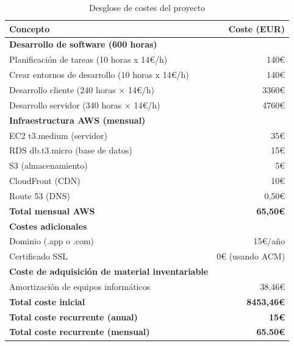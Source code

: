 \begin{table}[H]
	\centering
	\begin{tabular}{lr}
		\toprule
		\textbf{Concepto} & \textbf{Coste (EUR)} \\
		\midrule
		\textbf{Desarrollo de software (600 horas)} & \\
		\quad Planificación de tareas (10 horas x 14€/h) & 140€ \\
		\quad Crear entornos de desarrollo  (10 horas x 14€/h) & 140€ \\
		\quad Desarrollo cliente (240 horas × 14€/h) & 3360€ \\
		\quad Desarrollo servidor (340 horas × 14€/h) & 4760€ \\
		\midrule
		\textbf{Infraestructura AWS (mensual)} & \\
		\quad EC2 t3.medium (servidor) & 35€ \\
		\quad RDS db.t3.micro (base de datos) & 15€ \\
		\quad S3 (almacenamiento) & 5€ \\
		\quad CloudFront (CDN) & 10€ \\
		\quad Route 53 (DNS) & 0,50€ \\
		\quad \textbf{Total mensual AWS} & \textbf{65,50€} \\
		\midrule
		\textbf{Costes adicionales} & \\
		\quad Dominio (.app o .com) & 15€/año \\
		\quad Certificado SSL & 0€ (usando ACM) \\
		\midrule
		\textbf{Coste de adquisición de material inventariable} \\
		\quad Amortización de equipos informáticos & 38,46€ \\
		\midrule
		\textbf{Total coste inicial} & \textbf{8453,46€} \\
		\textbf{Total coste recurrente (anual)} & \textbf{15€} \\
		\textbf{Total coste recurrente (mensual)} & \textbf{65.50€} \\
		\bottomrule
	\end{tabular}
		\caption{Desglose de costes del proyecto}
\end{table}


